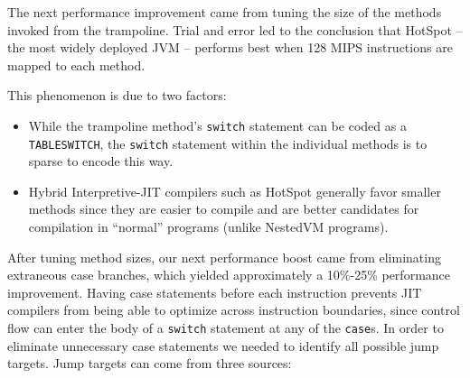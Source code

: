 \documentclass{acmconf}
\begin{document}
The next performance improvement came from tuning the size of the
methods invoked from the trampoline.  Trial and error led to the
conclusion that HotSpot \cite{hotspot} -- the most widely deployed JVM
-- performs best when 128 MIPS instructions are mapped to each method.


This phenomenon is due to two factors:

\begin{itemize}

\item While the trampoline method's {\tt switch} statement can be
      coded as a {\tt TABLESWITCH}, the {\tt switch} statement
      within the individual methods is to sparse to encode this way.

\item Hybrid Interpretive-JIT compilers such as HotSpot generally
      favor smaller methods since they are easier to compile and are
      better candidates for compilation in ``normal'' programs (unlike
      NestedVM programs).

\end{itemize}

After tuning method sizes, our next performance boost came from
eliminating extraneous case branches, which yielded approximately a
10\%-25\% performance improvement.  Having case statements before each
instruction prevents JIT compilers from being able to optimize across
instruction boundaries, since control flow can enter the body of a
{\tt switch} statement at any of the {\tt case}s.  In order to
eliminate unnecessary case statements we needed to identify all
possible jump targets.  Jump targets can come from three sources:
\end{document}
